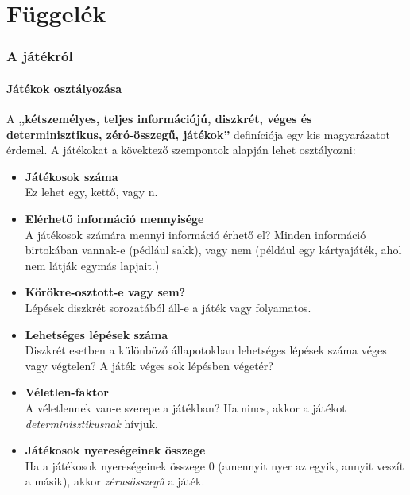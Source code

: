 \documentclass[twoside, a4paper, 12pt]{article}
\begin{document}
\part{Függelék}
\section{A játékról}
\subsection{Játékok osztályozása}
A \textbf{„kétszemélyes, teljes információjú, diszkrét, véges és determinisztikus, zéró-összegű, játékok”} definíciója egy kis magyarázatot érdemel. A játékokat a kövektező szempontok alapján lehet osztályozni:

\begin{itemize}
	\item \textbf{Játékosok száma} \\
	Ez lehet egy, kettő, vagy n.
	
	\item \textbf{Elérhető információ mennyisége} \\
	A játékosok számára mennyi információ érhető el? Minden információ birtokában vannak-e (pédlául sakk), vagy nem (például egy kártyajáték, ahol nem látják egymás lapjait.)
	
	\item \textbf{Körökre-osztott-e vagy sem?} \\
	Lépések diszkrét sorozatából áll-e a játék vagy folyamatos.
	
	\item \textbf{Lehetséges lépések száma} \\
	Diszkrét esetben a különböző állapotokban lehetséges lépések száma véges vagy végtelen? A játék véges sok lépésben végetér?
	
	\item \textbf{Véletlen-faktor} \\
	A véletlennek van-e szerepe a játékban? Ha nincs, akkor a játékot \textit{determinisztikusnak} hívjuk.
	
	\item \textbf{Játékosok nyereségeinek összege} \\
	Ha a játékosok nyereségeinek összege 0 (amennyit nyer az egyik, annyit veszít a másik), akkor \textit{zérusösszegű} a játék.
\end{itemize}
\end{document}
